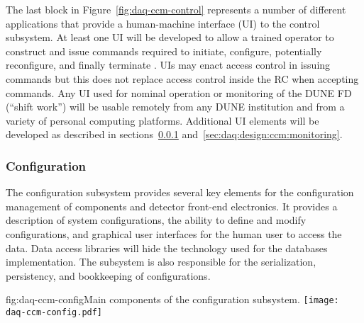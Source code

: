 The last block in Figure~\ref{fig:daq-ccm-control} represents a number of different applications that provide a human-machine interface (UI) to the control subsystem.
At least one UI will be developed to allow a trained operator to construct and issue commands required to initiate, configure, potentially reconfigure, and finally terminate . 
UIs may enact access control in issuing commands but this does not replace access control inside the RC when accepting commands.
Any UI used for nominal operation or monitoring of the DUNE FD  (``shift work'') will be usable remotely from any DUNE institution and from a variety of personal computing platforms.  
Additional UI elements will be developed as described in sections~\ref{sec:daq:design:ccm:configuration} and~\ref{sec:daq:design:ccm:monitoring}.


\subsubsection{Configuration}
\label{sec:daq:design:ccm:configuration}

The configuration subsystem provides several key elements for the configuration management of  components and detector front-end electronics. It provides a description of system configurations, the ability to define and modify configurations, and graphical user interfaces for the human user to access the data. Data access libraries will hide the technology used for the databases implementation. The subsystem is also responsible for the serialization, persistency, and bookkeeping of configurations. 

\begin{dunefigure}{fig:daq-ccm-config}{Main components of the  configuration subsystem.}
  \texttt{[image: daq-ccm-config.pdf]}
\end{dunefigure}

